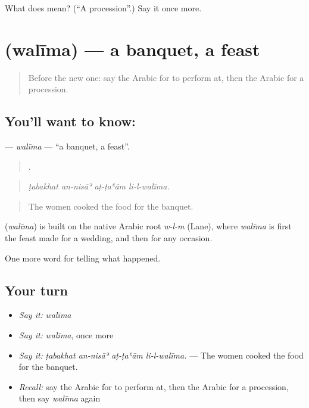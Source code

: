 \begin{tcolorbox}[breakable,colback=teal!4,colframe=teal!35!black,title={Before you move on}]
What does  mean? (\textquotedblleft{}A procession\textquotedblright{}.) Say it once more.
\end{tcolorbox}
\section[\texorpdfstring{\ar{وليمة} (walīma)}{وليمة (walīma)}]{ (walīma) — a banquet, a feast}

\label{lesson:AR-C328-walima}



\begin{quote}
Before the new one: say the Arabic for to perform at, then the Arabic for a procession.
\end{quote}

\subsection*{You'll want to know: }
\textbf{} — \emph{walīma} — \textquotedblleft{}a banquet, a feast\textquotedblright{}.

\begin{quote}
   .
\end{quote}

\begin{quote}
\emph{ṭabakhat an-nisāʾ aṭ-ṭaʿām li-l-walīma.}
\end{quote}

\begin{quote}
The women cooked the food for the banquet.
\end{quote}

\begin{cousinweb}
\textbf{} (\emph{walīma}) is built on the native Arabic root \emph{w-l-m} (Lane), where \emph{walīma} is first the feast made for a wedding, and then for any occasion.
\end{cousinweb}

\begin{grammarlens}[title={What you've built}]
One more word for telling what happened.
\end{grammarlens}

\subsection*{Your turn}
\begin{itemize}
\raggedright
  \item \emph{Say it:} \emph{walīma}
  \item \emph{Say it:} \emph{walīma}, once more
  \item \emph{Say it:} \emph{ṭabakhat an-nisāʾ aṭ-ṭaʿām li-l-walīma.} — The women cooked the food for the banquet.
  \item \emph{Recall:} say the Arabic for to perform at, then the Arabic for a procession, then say \emph{walīma} again
\end{itemize}

